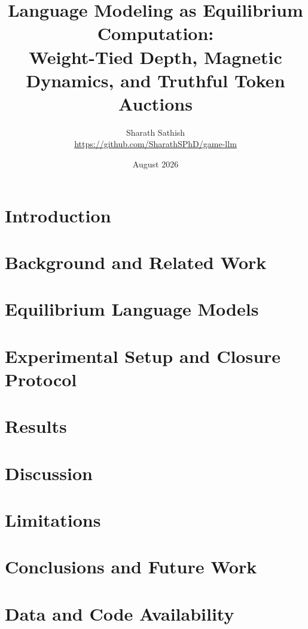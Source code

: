 \documentclass[11pt]{article}
\title{\textbf{Language Modeling as Equilibrium Computation:\\
Weight-Tied Depth, Magnetic Dynamics, and Truthful Token Auctions}}
\author{Sharath Sathish\\
\small \url{https://github.com/SharathSPhD/game-llm}}
\date{August 2026}
\theoremstyle{definition}
\begin{document}
\maketitle

\begin{abstract}

\end{abstract}

\section{Introduction}
\label{sec:intro}


\section{Background and Related Work}
\label{sec:background}


\section{Equilibrium Language Models}
\label{sec:method}


\section{Experimental Setup and Closure Protocol}
\label{sec:setup}


\section{Results}
\label{sec:results}


\section{Discussion}
\label{sec:discussion}


\section{Limitations}
\label{sec:limitations}


\section{Conclusions and Future Work}
\label{sec:conclusion}


\section*{Data and Code Availability}





\appendix

\end{document}
